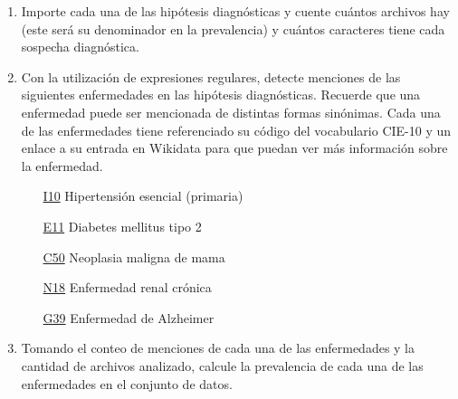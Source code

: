 \documentclass{article}
\begin{document}
\begin{enumerate}
	\item Importe cada una de las hipótesis diagnósticas y cuente cuántos archivos hay (este será su denominador en la prevalencia) y cuántos caracteres tiene cada sospecha diagnóstica.
	\item Con la utilización de expresiones regulares, detecte menciones de las siguientes enfermedades en las hipótesis diagnósticas. Recuerde que una enfermedad puede ser mencionada de distintas formas sinónimas. Cada una de las enfermedades tiene referenciado su código del vocabulario CIE-10 y un enlace a su entrada en Wikidata para que puedan ver más información sobre la enfermedad.
	      \begin{enumerate}
	      	\item[\href{https://www.wikidata.org/wiki/Q41861}{I10}] Hipertensión esencial (primaria)
	      	\item[\href{https://www.wikidata.org/wiki/Q3025883}{E11}] Diabetes mellitus tipo 2
	      	\item[\href{https://www.wikidata.org/wiki/Q128581}{C50}] Neoplasia maligna de mama
	      	\item[\href{https://www.wikidata.org/wiki/Q736715}{N18}] Enfermedad renal crónica 
	      	\item[\href{https://www.wikidata.org/wiki/Q11081}{G39}] Enfermedad de Alzheimer 
	      \end{enumerate}
	\item Tomando el conteo de menciones de cada una de las enfermedades y la cantidad de archivos analizado, calcule la prevalencia de cada una de las enfermedades en el conjunto de datos.
\end{enumerate}
\end{document}
